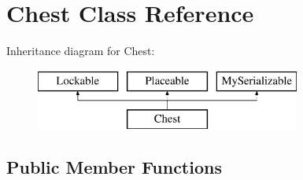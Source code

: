 \hypertarget{class_chest}{}\section{Chest Class Reference}
\label{class_chest}
Inheritance diagram for Chest\+:\begin{figure}[H]
\begin{center}
\leavevmode
\includegraphics[height=2.000000cm]{class_chest}
\end{center}
\end{figure}
\subsection*{Public Member Functions}
